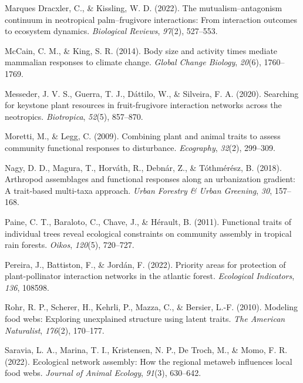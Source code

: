 \documentclass[
]{agujournal2019}
\newlength{\cslhangindent}
\newenvironment{CSLReferences}[2] %
 {\begin{list}{}{%
  \setlength{\itemindent}{0pt}
  \setlength{\leftmargin}{0pt}
  \setlength{\parsep}{0pt}
  \ifodd #1
   \setlength{\leftmargin}{\cslhangindent}
   \setlength{\itemindent}{-1\cslhangindent}
  \fi
  \setlength{\itemsep}{#2\baselineskip}}}
 {\end{list}}
\begin{document}
\begin{CSLReferences}{1}{0}
Marques Dracxler, C., \& Kissling, W. D. (2022). The
mutualism--antagonism continuum in neotropical palm--frugivore
interactions: From interaction outcomes to ecosystem dynamics.
\emph{Biological Reviews}, \emph{97}(2), 527--553.

McCain, C. M., \& King, S. R. (2014). Body size and activity times
mediate mammalian responses to climate change. \emph{Global Change
Biology}, \emph{20}(6), 1760--1769.

Messeder, J. V. S., Guerra, T. J., Dáttilo, W., \& Silveira, F. A.
(2020). Searching for keystone plant resources in fruit-frugivore
interaction networks across the neotropics. \emph{Biotropica},
\emph{52}(5), 857--870.

Moretti, M., \& Legg, C. (2009). Combining plant and animal traits to
assess community functional responses to disturbance. \emph{Ecography},
\emph{32}(2), 299--309.

Nagy, D. D., Magura, T., Horváth, R., Debnár, Z., \& Tóthmérész, B.
(2018). Arthropod assemblages and functional responses along an
urbanization gradient: A trait-based multi-taxa approach. \emph{Urban
Forestry \& Urban Greening}, \emph{30}, 157--168.

Paine, C. T., Baraloto, C., Chave, J., \& Hérault, B. (2011). Functional
traits of individual trees reveal ecological constraints on community
assembly in tropical rain forests. \emph{Oikos}, \emph{120}(5),
720--727.

Pereira, J., Battiston, F., \& Jordán, F. (2022). Priority areas for
protection of plant-pollinator interaction networks in the atlantic
forest. \emph{Ecological Indicators}, \emph{136}, 108598.

Rohr, R. P., Scherer, H., Kehrli, P., Mazza, C., \& Bersier, L.-F.
(2010). Modeling food webs: Exploring unexplained structure using latent
traits. \emph{The American Naturalist}, \emph{176}(2), 170--177.

Saravia, L. A., Marina, T. I., Kristensen, N. P., De Troch, M., \& Momo,
F. R. (2022). Ecological network assembly: How the regional metaweb
influences local food webs. \emph{Journal of Animal Ecology},
\emph{91}(3), 630--642.


\end{CSLReferences}
\end{document}
